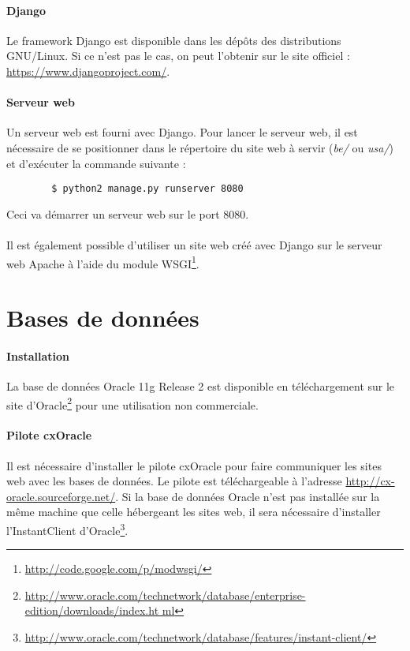 \documentclass[a4paper,12pt,french]{article}
\begin{document}
    \paragraph{Django}
    Le framework Django est disponible dans les dépôts des distributions
GNU/Linux. Si ce n'est pas le cas, on peut l'obtenir sur le site officiel :
\url{https://www.djangoproject.com/}.

    \paragraph{Serveur web}
    Un serveur web est fourni avec Django. Pour lancer le serveur web,
il est nécessaire de se positionner dans le répertoire du site web à servir
(\textit{be/} ou \textit{usa/}) et d'exécuter la commande suivante :
    \begin{lstlisting}
        $ python2 manage.py runserver 8080
    \end{lstlisting}
    Ceci va démarrer un serveur web sur le port 8080.
    
    \paragraph{}
    Il est également possible d'utiliser un site web créé avec Django sur le
serveur web Apache à l'aide du module
WSGI\footnote{\url{http://code.google.com/p/modwsgi/}}.

\section{Bases de données}
    \paragraph{Installation}
    La base de données Oracle 11g Release 2 est disponible en téléchargement
sur le site
d'Oracle\footnote{\url{
http://www.oracle.com/technetwork/database/enterprise-edition/downloads/index.ht
ml}} pour une utilisation non commerciale. 

    \paragraph{Pilote cxOracle}
    Il est nécessaire d'installer le pilote cxOracle pour faire communiquer les
sites web avec les bases de données. Le pilote est téléchargeable à l'adresse
\url{http://cx-oracle.sourceforge.net/}. Si la base de données Oracle n'est pas
installée sur la même machine que celle hébergeant les sites web, il sera
nécessaire d'installer l'InstantClient
d'Oracle\footnote{\url{
http://www.oracle.com/technetwork/database/features/instant-client/}}.
\end{document}
